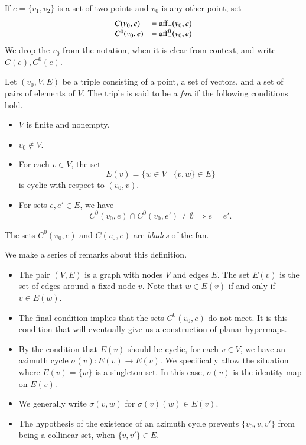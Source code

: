 If $e=\{v_1,v_2\}$ is a set of two points and $v_0$ is any other point,
set
  $$
  \begin{array}{lll}
  C(v_0,e) &= {\operatorname{aff}}_+(v_0,e)\\
  C^0(v_0,e) &= {\operatorname{aff}}^0_+(v_0,e)\\
  \end{array}
  $$
We drop the $v_0$ from the notation, when it is clear from context,
and write $C(e), C^0(e)$.


\begin{definition}  Let $(v_0,V,E)$ be a triple consisting of a point,
a set of
vectors, and a set of pairs of elements of $V$.  The triple is said to be
a {\it fan\/} if the following conditions hold.
    \begin{itemize}
    \item $V$ is finite and nonempty.
    \item $v_0\not\in V$.
    \item For each $v\in V$, the set
        $$
        E(v) = \{w\in V\mid \{v,w\}\in E\}
        $$
        is cyclic with respect to $(v_0,v)$.
    \item For sets $e,e'\in E$,   we have
        $$C^0(v_0,e) \cap C^0(v_0,e')\ne\emptyset\ \Rightarrow e = e'.$$
    \end{itemize}
The sets $C^0(v_0,e)$ and $C(v_0,e)$ are {\it blades\/} of the fan.
\end{definition}

We make a series of remarks about this definition.

\begin{remark}
\begin{itemize}
\item The pair $(V,E)$ is a graph with nodes $V$ and edges $E$.  The set
$E(v)$ is the set of edges around a fixed node $v$.
Note that $w\in E(v)$ if and only if $v\in E(w)$.   
%
\item The final condition implies that the sets $C^0(v_0,e)$
do not meet.   It
is this condition that will eventually give us a construction of planar
hypermaps.
%
\item
By the condition that $E(v)$ should be cyclic,
for each $v\in V$, we have an azimuth cycle $\sigma(v):E(v)\to E(v)$.
We specifically allow the situation where $E(v) = \{w\}$ is a
singleton set. In this case,
$\sigma(v)$ is the identity map on $E(v)$.
%
\item
We generally write $\sigma(v,w)$ for $\sigma(v)(w)\in E(v)$.
%
\item 
The hypothesis of the existence of an azimuth cycle
prevents $\{v_0,v,v'\}$ from being a collinear set, when $\{v,v'\}\in
E$.
%
\end{itemize}
\end{remark}




